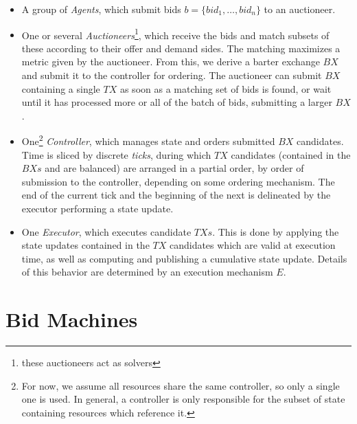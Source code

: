\begin{itemize}
    \item A group of \textit{Agents}, which submit bids $b = \{bid_1, \dots, bid_n\}$ to an auctioneer.
    \item One or several \textit{Auctioneers}\footnote{these auctioneers act as solvers}, which receive the bids and match subsets of these according to their offer and demand sides. The matching maximizes a metric given by the auctioneer. From this, we derive a barter exchange $BX$ and submit it to the controller for ordering. The auctioneer can submit $BX$ containing a single $TX$ as soon as a matching set of bids is found, or wait until it has processed more or all of the batch of bids, submitting a larger $BX$.
    \item One\footnote{For now, we assume all resources share the same controller, so only a single one is used. In general, a controller is only responsible for the subset of state containing resources which reference it.} \textit{Controller}, which manages state and orders submitted $BX$ candidates. Time is sliced by discrete \textit{ticks}, during which $TX$ candidates (contained in the $BXs$ and are balanced) are arranged in a partial order, by order of submission to the controller, depending on some ordering mechanism. The end of the current tick and the beginning of the next is delineated by the executor performing a state update.
    \item One \textit{Executor}, which executes candidate $TXs$. This is done by applying the state updates contained in the $TX$ candidates which are valid at execution time, as well as computing and publishing a cumulative state update. Details of this behavior are determined by an execution mechanism $E$. %
\end{itemize}



\section{Bid Machines}\label{sec:bid-machines}

